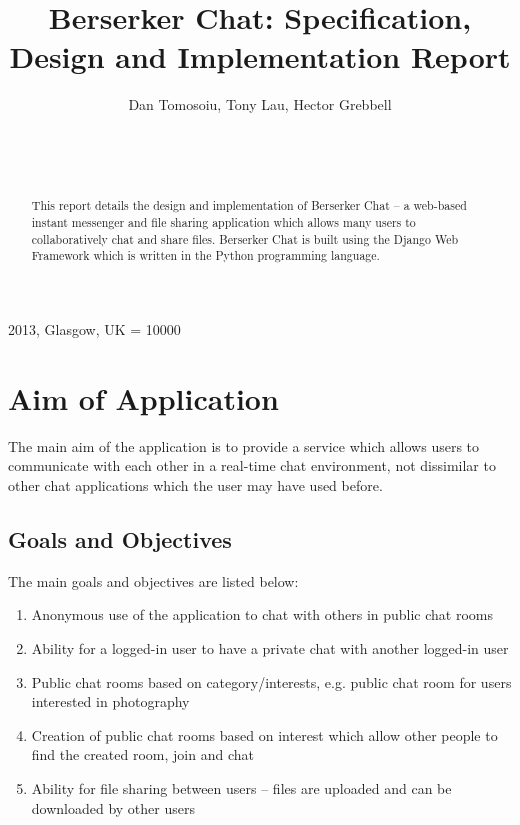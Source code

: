 \documentclass{sig-alt-release2}
\begin{document}
\newcommand{\todo}[1]{\textcolor{red}{#1}}
\def\newblock{\hskip .11em plus .33em minus .07em}

 {2013, Glasgow, UK} 
\widowpenalty = 10000

\title{{Berserker Chat: Specification, Design and Implementation Report}}

\author{
\alignauthor Dan Tomosoiu, Tony Lau, Hector Grebbell\\
\\
\\
\\
}
\maketitle

\begin{abstract}
This report details the design and implementation of Berserker Chat --
a web-based instant messenger and file sharing application which allows many users to
collaboratively chat and share files. Berserker Chat is built using the Django Web Framework\cite{django}
which is written in the Python programming language.

\end{abstract}

\section{Aim of Application}
The main aim of the application is to provide a service which allows users to communicate with each other in a real-time
chat environment, not dissimilar to other chat applications which the user may have used before.

\subsection{Goals and Objectives}
\label{sec: goals}
The main goals and objectives are listed below:
\begin{enumerate}
\item Anonymous use of the application to chat with others in public chat rooms
\item Ability for a logged-in user to have a private chat with another logged-in user
\item Public chat rooms based on category/interests, e.g. public chat room for users interested in photography
\item Creation of public chat rooms based on interest which allow other people to find the created room, join and chat
\item Ability for file sharing between users -- files are uploaded and can be downloaded by other users 
\end{enumerate}
\end{document}
